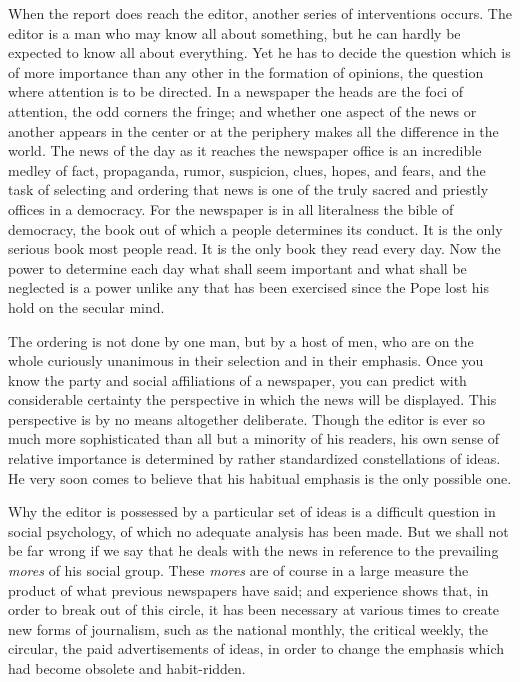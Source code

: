 \documentclass[openany,nobib,twoside,nohyper]{tufte-book}
\begin{document}
When the report does reach the editor, another series of interventions
occurs. The editor is a man who may know all about something, but he can
hardly be expected to know all about everything. Yet he has to decide
the question which is of more importance than any other in the formation
of opinions, the question where attention is to be directed. In a
newspaper the heads are the foci of attention, the odd corners the
fringe; and whether one aspect of the news or another appears in the
center or at the periphery makes all the difference in the world. The
news of the day as it reaches the newspaper office is an incredible
medley of fact, propaganda, rumor, suspicion, clues, hopes, and fears,
and the task of selecting and ordering that news is one of the truly
sacred and priestly offices in a democracy. For the newspaper is in all
literalness the bible of democracy, the book out of which a people
determines its conduct. It is the only serious book most people read. It
is the only book they read every day. Now the power to determine each
day what shall seem important and what shall be neglected is a power
unlike any that has been exercised since the Pope lost his hold on the
secular mind.

The ordering is not done by one man, but by a host of men, who are on
the whole curiously unanimous in their selection and in their emphasis.
Once you know the party and social affiliations of a newspaper, you can
predict with considerable certainty the perspective in which the news
will be displayed. This perspective is by no means altogether
deliberate. Though the editor is ever so much more sophisticated than
all but a minority of his readers, his own sense of relative importance
is determined by rather standardized constellations of ideas. He very
soon comes to believe that his habitual emphasis is the only possible
one.

Why the editor is possessed by a particular set of ideas is a difficult
question in social psychology, of which no adequate analysis has been
made. But we shall not be far wrong if we say that he deals with the
news in reference to the prevailing \emph{mores} of his social group.
These \emph{mores} are of course in a large measure the product of what
previous newspapers have said; and experience shows that, in order to
break out of this circle, it has been necessary at various times to
create new forms of journalism, such as the national monthly, the
critical weekly, the circular, the paid advertisements of ideas, in
order to change the emphasis which had become obsolete and habit-ridden.
\end{document}
